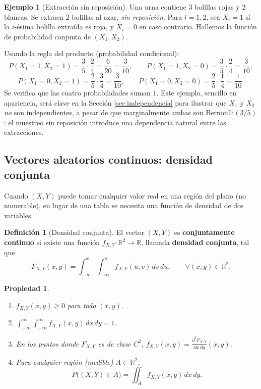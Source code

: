 \documentclass[11pt,a4paper]{article}
\theoremstyle{plain}
\newtheorem{propiedad}[teorema]{Propiedad}
\theoremstyle{definition}
\newtheorem{definicion}[teorema]{Definición}
\newtheorem{ejemplo}[teorema]{Ejemplo}
\theoremstyle{remark}
\begin{document}
\begin{ejemplo}[Extracción sin reposición]\label{ej:urna-sinreposicion}
Una urna contiene $3$ bolillas rojas y $2$ blancas. Se extraen $2$ bolillas al azar, \emph{sin reposición}. Para $i=1,2$, sea $X_i=1$ si la $i$-ésima bolilla extraída es roja, y $X_i=0$ en caso contrario. Hallemos la función de probabilidad conjunta de $(X_1,X_2)$.

Usando la regla del producto (probabilidad condicional):
\[
P(X_1=1,X_2=1) = \frac{3}{5}\cdot\frac{2}{4} = \frac{6}{20}=\frac{3}{10}, \qquad
P(X_1=1,X_2=0) = \frac{3}{5}\cdot\frac{2}{4} = \frac{3}{10},
\]
\[
P(X_1=0,X_2=1) = \frac{2}{5}\cdot\frac{3}{4} = \frac{3}{10}, \qquad
P(X_1=0,X_2=0) = \frac{2}{5}\cdot\frac{1}{4} = \frac{1}{10}.
\]
Se verifica que las cuatro probabilidades suman $1$. Este ejemplo, sencillo en apariencia, será clave en la Sección \ref{sec:independencia} para ilustrar que $X_1$ y $X_2$ \emph{no} son independientes, a pesar de que marginalmente ambas son Bernoulli$(3/5)$: el muestreo sin reposición introduce una dependencia natural entre las extracciones.
\end{ejemplo}

\subsection{Vectores aleatorios continuos: densidad conjunta}

Cuando $(X,Y)$ puede tomar cualquier valor real en una región del plano (no numerable), en lugar de una tabla se necesita una función de densidad de dos variables.

\begin{definicion}[Densidad conjunta]
El vector $(X,Y)$ es \textbf{conjuntamente continuo} si existe una función $f_{X,Y}:\mathbb R^2\to\mathbb R$, llamada \textbf{densidad conjunta}, tal que
\[
F_{X,Y}(x,y) = \int_{-\infty}^x\int_{-\infty}^y f_{X,Y}(u,v)\,dv\,du, \qquad \forall (x,y)\in\mathbb R^2.
\]
\end{definicion}

\begin{propiedad}
\begin{enumerate}[label=(\roman*)]
\item $f_{X,Y}(x,y)\ge0$ para todo $(x,y)$.
\item $\displaystyle\int_{-\infty}^{\infty}\int_{-\infty}^{\infty} f_{X,Y}(x,y)\,dx\,dy = 1$.
\item En los puntos donde $F_{X,Y}$ es de clase $C^2$, $\displaystyle f_{X,Y}(x,y) = \frac{\partial^2 F_{X,Y}}{\partial x\,\partial y}(x,y)$.
\item Para cualquier región (medible) $A\subset\mathbb R^2$,
\[
P\big((X,Y)\in A\big) = \iint_A f_{X,Y}(x,y)\,dx\,dy.
\]
\end{enumerate}
\end{propiedad}
\end{document}
